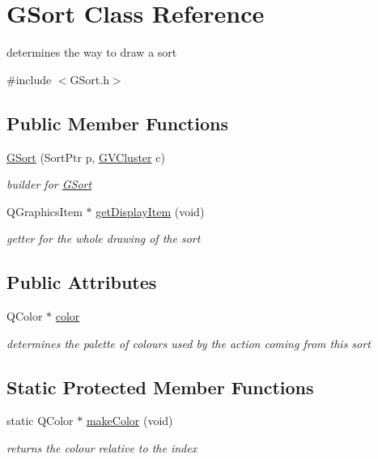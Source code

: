\hypertarget{class_g_sort}{\section{\-G\-Sort \-Class \-Reference}
\label{class_g_sort}
}


determines the way to draw a sort  




{\ttfamily \#include $<$\-G\-Sort.\-h$>$}

\subsection*{\-Public \-Member \-Functions}
\begin{DoxyCompactItemize}
\item 
\hyperlink{class_g_sort_a423709cc4cc15bc05219b08e1276f455}{\-G\-Sort} (\-Sort\-Ptr p, \hyperlink{struct_g_v_cluster}{\-G\-V\-Cluster} c)
\begin{DoxyCompactList}\small\item\em builder for \hyperlink{class_g_sort}{\-G\-Sort} \end{DoxyCompactList}\item 
\-Q\-Graphics\-Item $\ast$ \hyperlink{class_g_sort_aeff35f1b750ec1a81e6ea7034458c742}{get\-Display\-Item} (void)
\begin{DoxyCompactList}\small\item\em getter for the whole drawing of the sort \end{DoxyCompactList}\end{DoxyCompactItemize}
\subsection*{\-Public \-Attributes}
\begin{DoxyCompactItemize}
\item 
\hypertarget{class_g_sort_afdedfe6a6028c586a755315351eee309}{\-Q\-Color $\ast$ \hyperlink{class_g_sort_afdedfe6a6028c586a755315351eee309}{color}}\label{class_g_sort_afdedfe6a6028c586a755315351eee309}

\begin{DoxyCompactList}\small\item\em determines the palette of colours used by the action coming from this sort \end{DoxyCompactList}\end{DoxyCompactItemize}
\subsection*{\-Static \-Protected \-Member \-Functions}
\begin{DoxyCompactItemize}
\item 
static \-Q\-Color $\ast$ \hyperlink{class_g_sort_a03da0205abd58bad6c4a58419cb40568}{make\-Color} (void)
\begin{DoxyCompactList}\small\item\em returns the colour relative to the index \end{DoxyCompactList}\end{DoxyCompactItemize}
